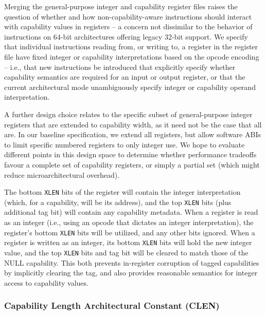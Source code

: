 Merging the general-purpose integer and capability register files raises the
question of whether and how non-capability-aware instructions should
interact with capability values in registers -- a concern not dissimilar to
the behavior of instructions on 64-bit architectures offering legacy 32-bit
support.
We specify that individual instructions reading from, or writing to, a
register in the register file have fixed integer or capability interpretations
based on the opcode encoding -- i.e., that new instructions be introduced that
explicitly specify whether capability semantics are required for an input or
output register, or that the current architectural mode unambiguously specify
integer or capability operand interpretation.

A further design choice relates to the specific subset of general-purpose
integer registers that are extended to capability width, as it need not be the
case that all are.
In our baseline specification, we extend all registers, but allow software
ABIs to limit specific numbered registers to only integer use.
We hope to evaluate different points in this design space to determine whether
performance tradeoffs favour a complete set of capability registers, or simply
a partial set (which might reduce microarchitectural overhead).

The bottom \texttt{XLEN} bits of the register will contain the integer
interpretation (which, for a capability, will be its address), and the
top \texttt{XLEN} bits (plus additional tag bit) will contain any capability
metadata.
When a register is read as an integer (i.e., using an opcode that dictates an
integer interpretation),
the register's bottom \texttt{XLEN} bits will be utilized, and any other bits ignored.
When a register is written as an integer, its bottom \texttt{XLEN} bits will
hold the new
integer value, and the top \texttt{XLEN} bits and tag bit will be cleared to match
those of the NULL capability. This both prevents in-register corruption of tagged
capabilities by implicitly clearing the tag, and also provides reasonable semantics
for integer access to capability values.

\subsubsection{Capability Length Architectural Constant (CLEN)}

